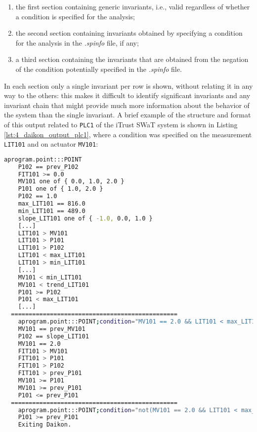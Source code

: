 \begin{enumerate}
	\item the first section containing generic invariants, i.e., valid regardless of whether a condition is specified for the analysis;
	
	\item the second section containing invariants obtained by specifying a condition for the analysis in the \textit{.spinfo} file, if any;
	
	\item a third section containing the invariants that are obtained from the negation of the condition potentially specified in the \textit{.spinfo} file.
\end{enumerate}

In each section only a single invariant per row is shown, without relating it in any way to the others: this makes it difficult to identify significant invariants and any invariant chain that might provide much more information about the behavior of the system than the single invariant.\newline
A brief example of the structure and format of this output related to \texttt{PLC1} of the iTrust SWaT system is shown in Listing \ref{lst:4_daikon_output_plc1}, where a condition was specified on the measurement \texttt{LIT101} and on actuator \texttt{MV101}: %

\begin{lstlisting}[language=bash,numbers=none,caption={Standard Daikon output for \texttt{PLC1} of the iTrust SWaT system},label=lst:4_daikon_output_plc1]
	aprogram.point:::POINT
	P102 == prev_P102
	FIT101 >= 0.0
	MV101 one of { 0.0, 1.0, 2.0 }
	P101 one of { 1.0, 2.0 }
	P102 == 1.0
	max_LIT101 == 816.0
	min_LIT101 == 489.0
	slope_LIT101 one of { -1.0, 0.0, 1.0 }
	[...]
	LIT101 > MV101
	LIT101 > P101
	LIT101 > P102
	LIT101 < max_LIT101
	LIT101 > min_LIT101
	[...]
	MV101 < min_LIT101
	MV101 < trend_LIT101
	P101 >= P102
	P101 < max_LIT101
	[...]
  ===============================================
	aprogram.point:::POINT;condition="MV101 == 2.0 && LIT101 < max_LIT101 - 16 && LIT101 > min_LIT101 + 15"
	MV101 == prev_MV101
	P102 == slope_LIT101
	MV101 == 2.0
	FIT101 > MV101
	FIT101 > P101
	FIT101 > P102
	FIT101 > prev_P101
	MV101 >= P101
	MV101 >= prev_P101
	P101 <= prev_P101
  ===============================================
	aprogram.point:::POINT;condition="not(MV101 == 2.0 && LIT101 < max_LIT101 - 16 && LIT101 > min_LIT101 + 15)"
	P101 >= prev_P101
	Exiting Daikon.
\end{lstlisting}

